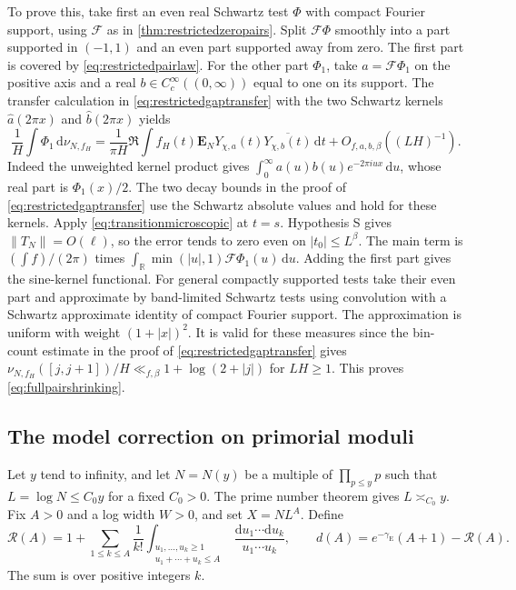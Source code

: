 \documentclass[11pt,a4paper]{article}
\numberwithin{equation}{section}
\newcommand{\ud}{\mathrm d}
\begin{document}
To prove this, take first an even real Schwartz test
$\Phi$ with compact Fourier support, using $\mathcal F$
as in \cref{thm:restrictedzeropairs}. Split $\mathcal F\Phi$
smoothly into a part supported in $(-1,1)$ and an even part
supported away from zero. The first part is covered by
\cref{eq:restrictedpairlaw}. For the other part $\Phi_1$,
take $a=\mathcal F\Phi_1$ on the positive axis and a real
$b\in C_c^\infty((0,\infty))$ equal to one on its support.
The transfer calculation in \cref{eq:restrictedgaptransfer}
with the two Schwartz kernels $\widehat a(2\pi x)$ and
$\widehat b(2\pi x)$ yields
\[
 \frac1H\int\Phi_1\,\ud\nu_{N,f_H}
   =\frac1{\pi H}\Re\int f_H(t)
         \mathbf E_N Y_{\chi,a}(t)\overline{Y_{\chi,b}(t)}
            \,\ud t+O_{f,a,b,\beta}((LH)^{-1}).
\]
Indeed the unweighted kernel product gives
$\int_0^\infty a(u)b(u)e^{-2\pi iux}\,\ud u$,
whose real part is $\Phi_1(x)/2$. The two decay bounds
in the proof of \cref{eq:restrictedgaptransfer} use the
Schwartz absolute values and hold for these kernels.
Apply \cref{eq:transitionmicroscopic} at $t=s$.
Hypothesis S gives $\|T_N\|=O(\ell)$, so the error tends
to zero even on $|t_0|\le L^\beta$.
The main term is $(\int f)/(2\pi)$ times
$\int_{\mathbb R}\min(|u|,1)\mathcal F\Phi_1(u)\,\ud u$.
Adding the first part gives the sine-kernel functional.
For general compactly supported tests take their even
part and approximate by band-limited Schwartz tests using
convolution with a Schwartz approximate identity of
compact Fourier support. The approximation is uniform with
weight $(1+|x|)^2$. It is valid for these measures since the
bin-count estimate in the proof of \cref{eq:restrictedgaptransfer}
gives $\nu_{N,f_H}([j,j+1])/H\ll_{f,\beta}1+\log(2+|j|)$
for $LH\ge1$. This proves \cref{eq:fullpairshrinking}.

\subsection{The model correction on primorial moduli}

Let $y$ tend to infinity, and let $N=N(y)$ be a multiple of
$\prod_{p\le y}p$ such that $L=\log N\le C_0y$ for a fixed
$C_0>0$. The prime number theorem gives $L\asymp_{C_0}y$.
Fix $A>0$ and a log width $W>0$, and set $X=NL^A$.
Define
\[
 \mathcal R(A)=1+
 \sum_{1\le k\le A}\frac{1}{k!}
  \int_{\substack{u_1,\ldots,u_k\ge1\\
                   u_1+\cdots+u_k\le A}}
                     \frac{\ud u_1\cdots\ud u_k}{u_1\cdots u_k},
 \qquad
 d(A)=e^{-\gamma_{\mathrm E}}(A+1)-\mathcal R(A).
\]
The sum is over positive integers $k$.
\end{document}
